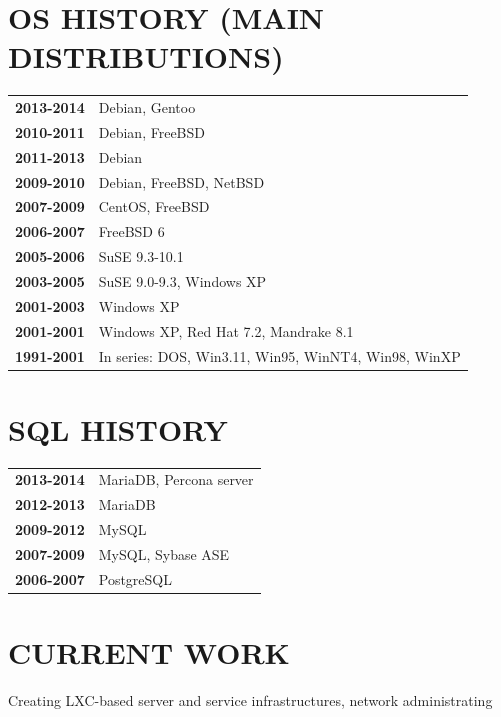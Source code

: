 \begin{resume}
\section{OS HISTORY (MAIN DISTRIBUTIONS)}
\vspace{0.1in} 
\begin{tabular}{rl}
{\bf 2013-2014} & Debian, Gentoo\\
{\bf 2010-2011} & Debian, FreeBSD\\
{\bf 2011-2013} & Debian\\
{\bf 2009-2010} & Debian, FreeBSD, NetBSD\\
{\bf 2007-2009} & CentOS, FreeBSD\\
{\bf 2006-2007} & FreeBSD 6\\
{\bf 2005-2006} & SuSE 9.3-10.1\\
{\bf 2003-2005} & SuSE 9.0-9.3, Windows XP\\
{\bf 2001-2003} & Windows XP\\
{\bf 2001-2001} & Windows XP, Red Hat 7.2, Mandrake 8.1\\
{\bf 1991-2001} & In series: DOS, Win3.11, Win95, WinNT4, Win98, WinXP\\
\end{tabular}

\section{SQL HISTORY}
\vspace{0.1in} 
\begin{tabular}{ll}
{\bf 2013-2014} & MariaDB, Percona server\\
{\bf 2012-2013} & MariaDB\\
{\bf 2009-2012} & MySQL\\
{\bf 2007-2009} & MySQL, Sybase ASE\\
{\bf 2006-2007} & PostgreSQL\\
\end{tabular}
\newpage
\section{CURRENT WORK}
\vspace{0.1in} 
    Creating LXC-based server and service infrastructures, network administrating


\end{resume}
